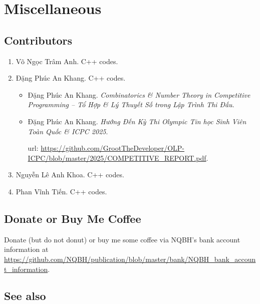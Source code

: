 \documentclass{article}
\begin{document}

\section{Miscellaneous}


\subsection{Contributors}

\begin{enumerate}
	\item {\sc Võ Ngọc Trâm Anh}. C++ codes.
	\item {\sc Đặng Phúc An Khang}. C++ codes.
	\begin{itemize}
		\item {\sc Đặng Phúc An Khang}. {\it Combinatorics \& Number Theory in Competitive Programming -- Tổ Hợp \& Lý Thuyết Số trong Lập Trình Thi Đấu}.
		\item {\sc Đặng Phúc An Khang}. {\it Hướng Đến Kỳ Thi Olympic Tin học Sinh Viên Toàn Quốc \& ICPC 2025}.
		
		{\sc url}: \url{https://github.com/GrootTheDeveloper/OLP-ICPC/blob/master/2025/COMPETITIVE_REPORT.pdf}.
	\end{itemize}
	\item {\sc Nguyễn Lê Anh Khoa}. C++ codes.
	\item {\sc Phan Vĩnh Tiến}. C++ codes.
\end{enumerate}

\subsection{Donate or Buy Me Coffee}
Donate (but do not donut) or buy me some coffee via NQBH's bank account information at \url{https://github.com/NQBH/publication/blob/master/bank/NQBH_bank_account_information}.

\subsection{See also}
\end{document}
